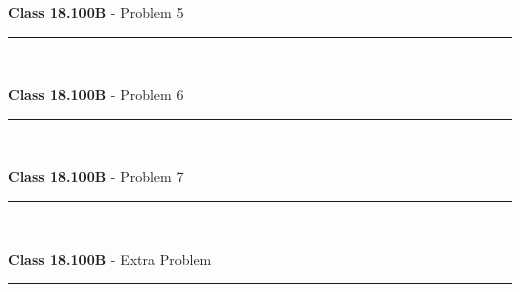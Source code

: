 \documentclass[11pt,reqno]{article}
\begin{document}
\vspace{15pt}
\begin{flushleft} 
\textbf{Class 18.100B} - Problem 5\\
\rule{500pt}{1pt}\\
\end{flushleft} 


\vspace{15pt}
\begin{flushleft} 
\textbf{Class 18.100B} - Problem 6\\
\rule{500pt}{1pt}\\
\end{flushleft} 


\vspace{15pt}
\begin{flushleft} 
\textbf{Class 18.100B} - Problem 7\\
\rule{500pt}{1pt}\\
\end{flushleft} 


\vspace{15pt}
\begin{flushleft} 
\textbf{Class 18.100B} - Extra Problem \\
\rule{500pt}{1pt}\\
\end{flushleft} 
\end{document}
